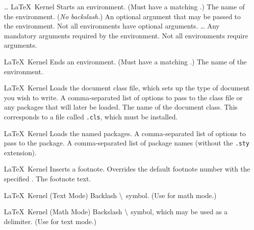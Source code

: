 %
 {\ldots{}}%
 {\LaTeX\ Kernel}%
 {%
   Starts an environment. (Must have a matching .)
 }%
 {%
   \BeginArgList
     The name of the environment. (\emph{No
      backslash.})
     An optional argument that may be 
      passed to the environment. Not all environments have optional
      arguments.
    \ldots{} Any mandatory
      arguments required by the environment. Not all environments
      require arguments.
   \EndArgList
 }

%
  {}%
  {\LaTeX\ Kernel}%
  {Ends an environment. (Must have a matching .)}
  {%
    \BeginArgList
       The name of the environment.
    \EndArgList
  }

%
 {}%
 {\LaTeX\ Kernel}%
 {%
   Loads the document class file, which sets up the type of document
   you wish to write.%
 }%
 {%
   \BeginArgList
     A comma-separated list of options to
     pass to the class file or any packages that will later be
     loaded.
     The name of the document class. This
    corresponds to a file called \texttt{.cls},
    which must be installed. 
   \EndArgList
 }

%
 {}%
 {\LaTeX\ Kernel}%
 {%
   Loads the named packages.%
 }%
 {%
   \BeginArgList
     A comma-separated list of options to
     pass to the package.
     A comma-separated list of package
     names (without the \texttt{.sty} extension).
   \EndArgList
 }

%
 {}%
 {\LaTeX\ Kernel}%
 {Inserts a footnote.}%
 {%
  \BeginArgList
     Overrides the default footnote number with
    the specified .
     The footnote text.
  \EndArgList
 }%

%
 {}%
 {\LaTeX\ Kernel (Text Mode)}%
 {Backlash \textbackslash\ symbol. (Use
   for math mode.)}%
 {}

%
 {}%
 {\LaTeX\ Kernel (Math Mode)}%
 {Backslash \protect\ensuremath{\protect\backslash} symbol, which may be used
  as a delimiter. (Use
  for text mode.)}%
 {}


